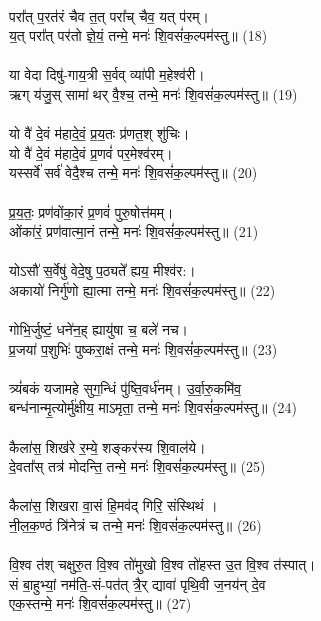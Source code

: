 \\
परा᳚त् प॒रत॑रं चैव त॒त् परा᳚च् चैव॒ यत् प॑रम्। \\
य॒त् परा᳚त् पर॑तो ज्ञे॒यं॒ तन्मे॒ मनः॑ शि॒वसं॑क॒ल्पम॑स्तु॥ (18)\\
\\
या वेदा दिषु॑-गाय॒त्री स॒र्वव् व्या॑पी म॒हेश्व॑री। \\
ऋग् य॑जु॒स् सामा॑ थर् वै॒श्च॒ तन्मे॒ मनः॑ शि॒वसं॑क॒ल्पम॑स्तु॥ (19)\\
\\
यो वै॑ दे॒वं म॑हादे॒वं॒ प्र॒य॒तः प्र॑णत॒श् शु॑चिः। \\
{\small यो वै॑ दे॒वं म॑हादे॒वं प्र॒णवं॑ पर॒मेश्व॑रम्।}\\
यस्सर्वे॑ सर्व॑ वेदै॒श्च तन्मे॒ मनः॑ शि॒वसं॑क॒ल्पम॑स्तु॥ (20)\\
\\
प्र॒य॒तः॒ प्रण॑वोंका॒रं प्र॒णवं॑ पुरु॒षोत्त॑मम्। \\
ओंका॑रं॒ प्रण॑वात्मा॒नं तन्मे॒ मनः॑ शि॒वसं॑क॒ल्पम॑स्तु॥ (21)\\
\\
योऽसौ॑ स॒र्वेषु॑ वेदे॒षु प॒ठ्यते᳚ ह्यय॒ मीश्व॑र:। \\
अकायो॑ निर्गु॑णो ह्या॒त्मा तन्मे॒ मनः॑ शि॒वसं॑क॒ल्पम॑स्तु॥ (22)\\
\\
गोभि॒र्जुष्टं॒ धने॑न॒ह् ह्यायु॑षा च॒ बले॑ नच। \\
प्र॒जया॑ प॒शुभिः॑ पुष्करा॒क्षं तन्मे॒ मनः॑ शि॒वसं॑क॒ल्पम॑स्तु॥ (23)\\
  \\
त्र्यं॑बकं यजामहे सुग॒न्धिं पु॑ष्ति॒वर्ध॑नम्। उ॒र्वा॒रु॒कमि॑व॒ \\
बन्ध॑नान्मृ॒त्योर्मु॑क्षीय॒ माऽमृता॒ तन्मे॒ मनः॑ शि॒वसं॑क॒ल्पम॑स्तु॥ (24)\\
\\
कैला॑स॒ शिख॑रे र॒म्ये॒ शङ्कर॑स्य शि॒वाल॑ये। \\
दे॒वता᳚स् तत्र॑ मोदन्ति॒ तन्मे॒ मनः॑ शि॒वसं॑क॒ल्पम॑स्तु॥ (25)\\
\\
कैला॑स॒ शिखरा वा॒सं हि॒मव॑द् गिरि॒ संस्थिथं । \\
नी॒ल॒क॒ण्ठं त्रि॑नेत्रं च तन्मे॒ मनः॑ शि॒वसं॑क॒ल्पम॑स्तु॥ (26)\\
\\
वि॒श्व त॑श् चक्षुरु॒त वि॒श्व तो॑मुखो वि॒श्व तो॑हस्त उ॒त वि॒श्व त॑स्पात्।\\
सं बा॒हुभ्यां॒ नम॑ति॒-सं-पत॑त् त्रै॒र् द्यावा॑ पृथि॒वी ज॒नय॑न् दे॒व\\
 एक॒स्तन्मे॒ मनः॑ शि॒वसं॑क॒ल्पम॑स्तु॥ (27)\\
